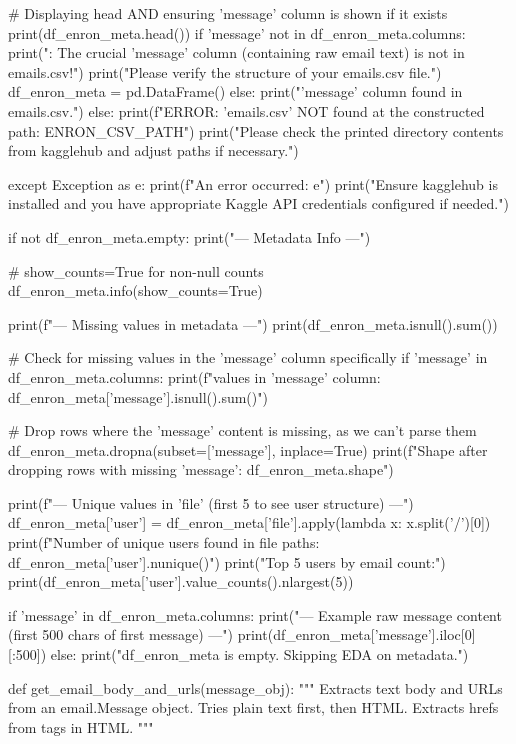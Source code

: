 \begin{ffcode}
        # Displaying head AND ensuring 'message' column is shown if it exists
        print(df_enron_meta.head())
        if 'message' not in df_enron_meta.columns:
            print("\nERROR: The crucial 'message' column (containing raw email text) is not in emails.csv!")
            print("Please verify the structure of your emails.csv file.")
            df_enron_meta = pd.DataFrame()
        else:
            print("\n'message' column found in emails.csv.")
    else:
        print(f"ERROR: 'emails.csv' NOT found at the constructed path: {ENRON_CSV_PATH}")
        print("Please check the printed directory contents from kagglehub and adjust paths if necessary.")

except Exception as e:
    print(f"An error occurred: {e}")
    print("Ensure kagglehub is installed and you have appropriate Kaggle API credentials configured if needed.")
     
    if not df_enron_meta.empty:
    print("--- Metadata Info ---")

    # show_counts=True for non-null counts
    df_enron_meta.info(show_counts=True)

    print(f"\n--- Missing values in metadata ---")
    print(df_enron_meta.isnull().sum())

    # Check for missing values in the 'message' column specifically
    if 'message' in df_enron_meta.columns:
        print(f"\nMissing values in 'message' column: {df_enron_meta['message'].isnull().sum()}")

        # Drop rows where the 'message' content is missing, as we can't parse them
        df_enron_meta.dropna(subset=['message'], inplace=True)
        print(f"Shape after dropping rows with missing 'message': {df_enron_meta.shape}")

    print(f"\n--- Unique values in 'file' (first 5 to see user structure) ---")
    df_enron_meta['user'] = df_enron_meta['file'].apply(lambda x: x.split('/')[0])
    print(f"Number of unique users found in file paths: {df_enron_meta['user'].nunique()}")
    print("Top 5 users by email count:")
    print(df_enron_meta['user'].value_counts().nlargest(5))

    if 'message' in df_enron_meta.columns:
        print("\n--- Example raw message content (first 500 chars of first message) ---")
        print(df_enron_meta['message'].iloc[0][:500])
else:
    print("df_enron_meta is empty. Skipping EDA on metadata.")

    def get_email_body_and_urls(message_obj):
    """
    Extracts text body and URLs from an email.Message object.
    Tries plain text first, then HTML. Extracts hrefs from  tags in HTML.
    """


\end{ffcode}
